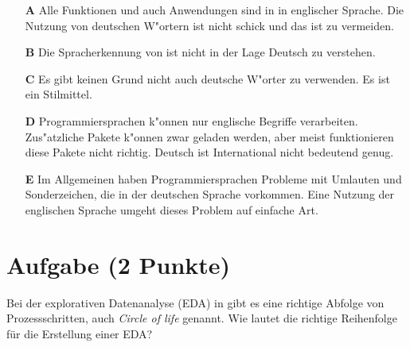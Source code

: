 \documentclass[a4paper, 9pt]{scrartcl}\usepackage[]{graphicx}\usepackage[]{xcolor}
\begin{document}
\begin{enumerate}
\item [\textbf{A} \msquare] Alle Funktionen und auch Anwendungen sind in \Rlogo in englischer Sprache. Die Nutzung von deutschen W{"o}rtern ist nicht schick und das ist zu vermeiden.
\item [\textbf{B} \msquare] Die Spracherkennung von \Rlogo ist nicht in der Lage Deutsch zu verstehen.
\item [\textbf{C} \msquare] Es gibt keinen Grund nicht auch deutsche W{"o}rter zu verwenden. Es ist ein Stilmittel.
\item [\textbf{D} \msquare] Programmiersprachen k{"o}nnen nur englische Begriffe verarbeiten. Zus{"a}tzliche Pakete k{"o}nnen zwar geladen werden, aber meist funktionieren diese Pakete nicht richtig. Deutsch ist International nicht bedeutend genug.
\item [\textbf{E} \msquare] Im Allgemeinen haben Programmiersprachen Probleme mit Umlauten und Sonderzeichen, die in der deutschen Sprache vorkommen. Eine Nutzung der englischen Sprache umgeht dieses Problem auf einfache Art.
\end{enumerate}

\section{Aufgabe \hfill (2 Punkte)}

Bei der explorativen Datenanalyse (EDA) in \Rlogo gibt es eine richtige Abfolge von Prozessschritten, auch \textit{Circle of life} genannt. Wie lautet die richtige Reihenfolge f{\"u}r die Erstellung einer EDA?
\end{document}
